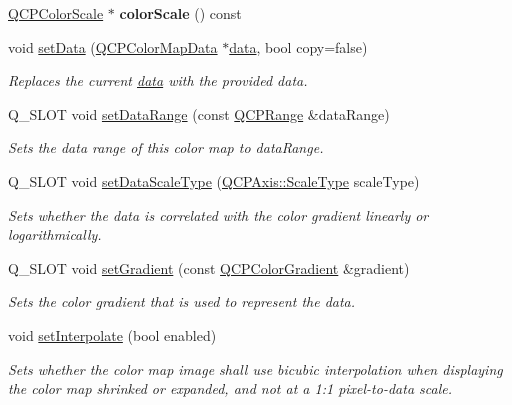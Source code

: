 \begin{DoxyCompactItemize}
\item 
\hypertarget{classQCPColorMap_a6bd82e0b042a2ec4d64f40853a3b05e3}{}\hyperlink{classQCPColorScale}{Q\+C\+P\+Color\+Scale} $\ast$ {\bfseries color\+Scale} () const \label{classQCPColorMap_a6bd82e0b042a2ec4d64f40853a3b05e3}

\item 
void \hyperlink{classQCPColorMap_a5a23e133a20c4ccad35fd32e6c0f9809}{set\+Data} (\hyperlink{classQCPColorMapData}{Q\+C\+P\+Color\+Map\+Data} $\ast$\hyperlink{classQCPColorMap_a3ae12c9ce842352037cd20ea5267414f}{data}, bool copy=false)
\begin{DoxyCompactList}\small\item\em Replaces the current \hyperlink{classQCPColorMap_a3ae12c9ce842352037cd20ea5267414f}{data} with the provided {\itshape data}. \end{DoxyCompactList}\item 
Q\+\_\+\+S\+L\+O\+T void \hyperlink{classQCPColorMap_a980b42837821159786a85b4b7dcb8774}{set\+Data\+Range} (const \hyperlink{classQCPRange}{Q\+C\+P\+Range} \&data\+Range)
\begin{DoxyCompactList}\small\item\em Sets the data range of this color map to {\itshape data\+Range}. \end{DoxyCompactList}\item 
Q\+\_\+\+S\+L\+O\+T void \hyperlink{classQCPColorMap_a9d20aa08e3c1f20f22908c45b9c06511}{set\+Data\+Scale\+Type} (\hyperlink{classQCPAxis_a36d8e8658dbaa179bf2aeb973db2d6f0}{Q\+C\+P\+Axis\+::\+Scale\+Type} scale\+Type)
\begin{DoxyCompactList}\small\item\em Sets whether the data is correlated with the color gradient linearly or logarithmically. \end{DoxyCompactList}\item 
Q\+\_\+\+S\+L\+O\+T void \hyperlink{classQCPColorMap_a7313c78360471cead3576341a2c50377}{set\+Gradient} (const \hyperlink{classQCPColorGradient}{Q\+C\+P\+Color\+Gradient} \&gradient)
\begin{DoxyCompactList}\small\item\em Sets the color gradient that is used to represent the data. \end{DoxyCompactList}\item 
void \hyperlink{classQCPColorMap_a484eaa8a5065cfc386b15375bf98b964}{set\+Interpolate} (bool enabled)
\begin{DoxyCompactList}\small\item\em Sets whether the color map image shall use bicubic interpolation when displaying the color map shrinked or expanded, and not at a 1\+:1 pixel-\/to-\/data scale. \end{DoxyCompactList}\item 

\end{DoxyCompactItemize}
